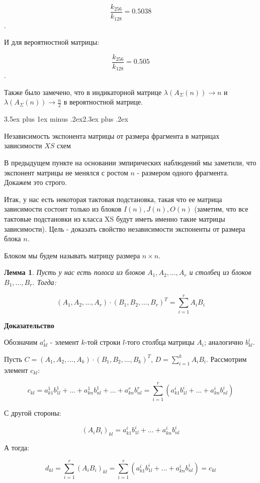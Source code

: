 \documentclass[a4paper,12pt]{report}
\makeatletter
\theoremstyle{plain} %
\newtheorem{Lemma}{Лемма}[chapter]
\theoremstyle{definition}
\theoremstyle{remark}
\renewcommand{\section}{\@startsection{section}{1}{18pt}%
{3.5ex plus 1ex minus .2ex}{2.3ex plus .2ex}%
{\normalfont\Large\bfseries\raggedright}}%
\makeatother
\begin{document}
\begin{large}
$$\frac{k_{256}}{k_{128}} = 0.5038$$. 

И для вероятностной матрицы:

$$\frac{k_{256}}{k_{128}} = 0.505$$. 

Также было замечено, что в индикаторной матрице $\lambda(A_{\Sigma}(n)) \rightarrow n$ и $\lambda(A_{\Sigma}(n)) \rightarrow \frac{n}{2}$ в вероятностной матрице.

\section{Независимость экспонента матрицы от размера фрагмента в матрицах зависимости $XS$ схем}

В предыдущем пункте на основании эмпирических наблюдений мы заметили, что экспонент матрицы не менялся с ростом $n$ - размером одного фрагмента. Докажем это строго.

Итак, у нас есть некоторая тактовая подстановка, такая что ее матрица зависимости состоит только из блоков $I(n), J(n), O(n)$ (заметим, что все тактовые подстановки из класса XS будут иметь именно такие матрицы зависимости). Цель - доказать свойство независимости экспоненты от размера блока $n$.

Блоком мы будем называть матрицу размера $n \times n$.

\begin{Lemma}
Пусть у нас есть полоса из блоков $A_1, A_2, ..., A_r$ и столбец из блоков $B_1, ..., B_r$. Тогда:

$$(A_1, A_2, ..., A_r) \cdot (B_1, B_2, ..., B_r)^T = \sum_{i=1}^r A_iB_i$$
\end{Lemma}

\textbf{Доказательство}

Обозначим $a_{kl}^i$ - элемент $k$-той строки $l$-того столбца матрицы $A_i$; аналогично $b_{kl}^i$.

Пусть $C = (A_1, A_2, ..., A_k ) \cdot (B_1, B_2, ..., B_k)^T $, $D =  \sum_{i=1}^k A_iB_i$. Рассмотрим элемент $c_{kl}$:

$$c_{kl} = a^1_{k1}b^1_{1l} + ... +a^1_{kn}b^1_{nl} + ... +a^r_{kn}b^r_{nl} = \sum_{i=1}^r (a^i_{k1}b^i_{1l} + ... + a^i_{kn}b^i_{nl})$$

С другой стороны:

$$(A_iB_i)_{kl} = a^i_{k1}b^i_{1l} + ... + a^i_{kn}b^i_{nl}$$

А тогда:

$$d_{kl} = \sum_{i=1}^r (A_iB_i)_{kl} =  \sum_{i=1}^r (a^i_{k1}b^i_{1l} + ... + a^i_{kn}b^i_{nl}) = c_{kl}$$


\end{large}
\end{document}
